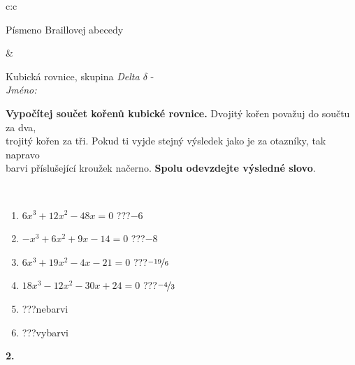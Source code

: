 \documentclass[10pt]{report}
\begin{document}
\begin{tabular}{c:c}
\begin{minipage}[c][104.5mm][t]{0.5\linewidth}
\begin{center}
\begin{minipage}{0.20\linewidth}
\begin{center}
{\small Písmeno Braillovej abecedy}
\end{center}
\end{minipage}
\end{center}
\end{minipage}
&
\begin{minipage}[c][104.5mm][t]{0.5\linewidth}
\begin{center}
\vspace{7mm}
{\huge Kubická rovnice, skupina \textit{Delta $\delta$} -}\\[5mm]
\textit{Jméno:}\phantom{xxxxxxxxxxxxxxxxxxxxxxxxxxxxxxxxxxxxxxxxxxxxxxxxxxxxxxxxxxxxxxxxx}\\[5mm]
\begin{minipage}{0.95\linewidth}
\begin{center}
\textbf{Vypočítej součet kořenů kubické rovnice.} Dvojitý kořen považuj do součtu za dva,\\trojitý kořen za tři. Pokud ti vyjde stejný výsledek jako je za otazníky, tak napravo\\barvi příslušející kroužek načerno. \textbf{Spolu odevzdejte výsledné slovo}.
\end{center}
\end{minipage}
\\[1mm]
\begin{minipage}{0.79\linewidth}
\begin{center}
\begin{varwidth}{\linewidth}
\begin{enumerate}
\Large
\item $6x^3+12x^2-48x=0$\quad \dotfill\; ???\;\dotfill \quad $-6$
\item $-x^3+6x^2+9x-14=0$\quad \dotfill\; ???\;\dotfill \quad $-8$
\item $6x^3+19x^2-4x-21=0$\quad \dotfill\; ???\;\dotfill \quad $\nicefrac{-19}{6}$
\item $18x^3-12x^2-30x+24=0$\quad \dotfill\; ???\;\dotfill \quad $\nicefrac{-4}{3}$
\item \quad \dotfill\; ???\;\dotfill \quad nebarvi
\item \quad \dotfill\; ???\;\dotfill \quad vybarvi
\end{enumerate}
\end{varwidth}
\end{center}
\end{minipage}
\begin{minipage}{0.20\linewidth}
\begin{center}
{\Huge\bfseries 2.} \\[2mm]

\end{center}
\end{minipage}
\end{center}
\end{minipage}
\end{tabular}
\end{document}
